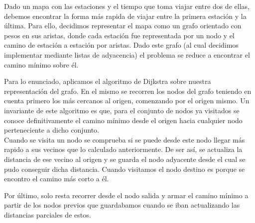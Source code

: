 Dado un mapa con las estaciones y el tiempo que toma viajar entre dos de ellas, debemos encontrar la forma más rapida de viajar entre la primera estación y la \'ultima. Para ello, decidimos representar el mapa como un grafo orientado con pesos en sus aristas, donde cada estaci\'on fue representada por un nodo y el camino de estaci\'on a estaci\'on por aristas. Dado este grafo (al cual decidimos implementar mediante listas de adyacencia) el problema se reduce a encontrar el camino mínimo sobre él.

Para lo enunciado, aplicamos el algoritmo de Dijkstra sobre nuestra representación del grafo. 
En el mismo se recorren los nodos del grafo teniendo en cuenta primero los más cercanos al origen, comenzando por el origen mismo. Un invariante de este algoritmo es que, para el conjunto de nodos ya visitados se conoce definitivamente el camino mínimo desde el origen hacia cualquier nodo perteneciente a dicho conjunto.\\
Cuando se visita un nodo se comprueba si se puede desde este nodo llegar más rapido a sus vecinos que lo calculado anteriormente. De ser así, se actualiza la distancia de ese vecino al origen y se guarda el nodo adyacente desde  el cual se pudo conseguir dicha distancia. Cuando visitamos el nodo destino es porque se encontro el camino más corto a él.


Por \'ultimo, solo resta recorrer desde el nodo salida y armar el camino mínimo a partir de los nodos previos que guardabamos cuando se iban actualizando las distancias parciales de estos.
